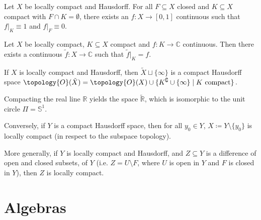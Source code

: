 \documentclass[a4paper]{article}
\begin{document}
\begin{lemma}
	Let $X$ be locally compact and Hausdorff.
	For all $F \subseteq X$ closed and $K \subseteq X$ compact with $F \cap K = \emptyset$, there exists an $f: X \to [0,1]$ continuous such that $f|_K \equiv 1$ and $f|_F \equiv 0$.
\end{lemma}

\begin{theorem}
	Let $X$ be locally compact, $K \subseteq X$ compact and $f: K \to \mathds{C}$ continuous. Then there exists a continuous $\tilde f: X \to \mathds{C}$ such that $\tilde f|_K = f$.
\end{theorem}

\begin{theorem}
	If $X$ is locally compact and Hausdorff, then $\tilde X \sqcup \{\infty\}$ is a compact Hausdorff space $\topology{O}(\tilde X) = \topology{O}(X) \cup \{K^\complement \cup \{\infty\} \mid K \text{ compact} \}$.
\end{theorem}

\begin{example}
	Compacting the real line $\mathds{R}$ yields the space $\tilde{\mathds{R}}$, which is isomorphic to the unit circle $\Pi = \mathds{S}^1$.
\end{example}

\begin{theorem}
	Conversely, if $Y$ is a compact Hausdorff space, then for all $y_0 \in Y$, $X \coloneqq Y \setminus \{y_0\}$ is locally compact (in respect to the subspace topology).

	More generally, if $Y$ is locally compact and Hausdorff, and $Z \subseteq Y$ is a difference of open and closed subsets, of $Y$ (i.e. $Z = U \setminus F$, where $U$ is open in $Y$ and $F$ is closed in $Y$), then $Z$ is locally compact.
\end{theorem}

\section{Algebras}
\end{document}
